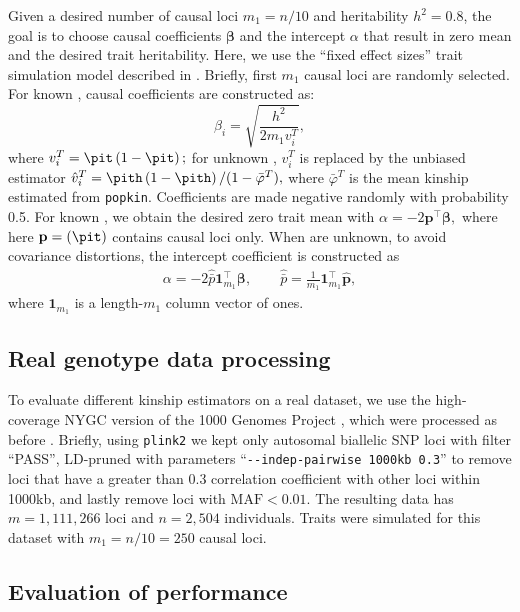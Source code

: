 \documentclass[11pt]{article}
\begin{document}
Given a desired number of causal loci $m_1 = n/10$ and heritability $h^2=0.8$, the goal is to choose causal coefficients $\boldsymbol{\beta}$ and the intercept $\alpha$ that result in zero mean and the desired trait heritability.
Here, we use the ``fixed effect sizes'' trait simulation model described in \citep{yao_limitations_2022}.
Briefly, first $m_1$ causal loci are randomly selected.
For known \pit, causal coefficients are constructed as:
$$
\beta_i = \sqrt{ \frac{h^2}{ 2 m_1 v_i^T } },
$$
where
$
v_i^T
=
\pit \left( 1 - \pit \right)
;
$
for unknown \pit,  $v_i^T$ is replaced by the unbiased estimator
$
\hat{v}_i^T
=
\pith \left( 1 - \pith \right) / ( 1 - \bar{\varphi}^T )
,
$
where $\bar{\varphi}^T$ is the mean kinship estimated from \texttt{popkin}.
Coefficients are made negative randomly with probability 0.5.
For known \pit, we obtain the desired zero trait mean with
$
\alpha 
=
- 2 \mathbf{p}^\intercal \boldsymbol{\beta}
,
$
where here $\mathbf{p} = (\pit)$ contains causal loci only.
When \pit are unknown, to avoid covariance distortions, the intercept coefficient is constructed as
\begin{align*}
  \alpha 
  =
  - 2 \hat{\bar{p}} \mathbf{1}_{m_1}^\intercal \boldsymbol{\beta}
  , \quad\quad
  \hat{\bar{p}}
  =
  \frac{1}{m_1} \mathbf{1}_{m_1}^\intercal \mathbf{\hat{p}}
  ,
\end{align*}
where $\mathbf{1}_{m_1}$ is a length-$m_1$ column vector of ones.

\subsection{Real genotype data processing}

To evaluate different kinship estimators on a real dataset, we use the high-coverage NYGC version of the 1000 Genomes Project \citep{fairley_international_2020}, which were processed as before \citep{yao_limitations_2022}.
Briefly, using \texttt{plink2} \citep{chang_second-generation_2015} we kept only autosomal biallelic SNP loci with filter ``PASS'', LD-pruned with parameters ``\texttt{-{}-indep-pairwise 1000kb 0.3}'' to remove loci that have a greater than 0.3 correlation coefficient with other loci within 1000kb, and lastly remove loci with $\text{MAF} < 0.01$.
The resulting data has $m=1,111,266$ loci and $n=2,504$ individuals.
Traits were simulated for this dataset with $m_1 = n/10 = 250$ causal loci.

\subsection{Evaluation of performance}
\end{document}
